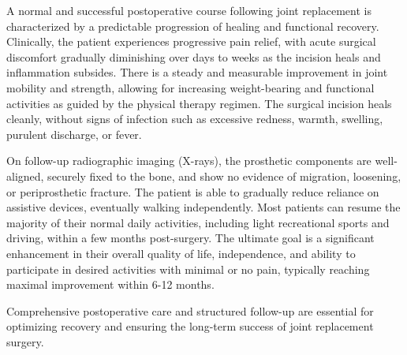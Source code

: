 A normal and successful postoperative course following joint replacement is characterized by a predictable progression of healing and functional recovery. Clinically, the patient experiences progressive pain relief, with acute surgical discomfort gradually diminishing over days to weeks as the incision heals and inflammation subsides. There is a steady and measurable improvement in joint mobility and strength, allowing for increasing weight-bearing and functional activities as guided by the physical therapy regimen. The surgical incision heals cleanly, without signs of infection such as excessive redness, warmth, swelling, purulent discharge, or fever.

On follow-up radiographic imaging (X-rays), the prosthetic components are well-aligned, securely fixed to the bone, and show no evidence of migration, loosening, or periprosthetic fracture. The patient is able to gradually reduce reliance on assistive devices, eventually walking independently. Most patients can resume the majority of their normal daily activities, including light recreational sports and driving, within a few months post-surgery. The ultimate goal is a significant enhancement in their overall quality of life, independence, and ability to participate in desired activities with minimal or no pain, typically reaching maximal improvement within 6-12 months.

Comprehensive postoperative care and structured follow-up are essential for optimizing recovery and ensuring the long-term success of joint replacement surgery.

